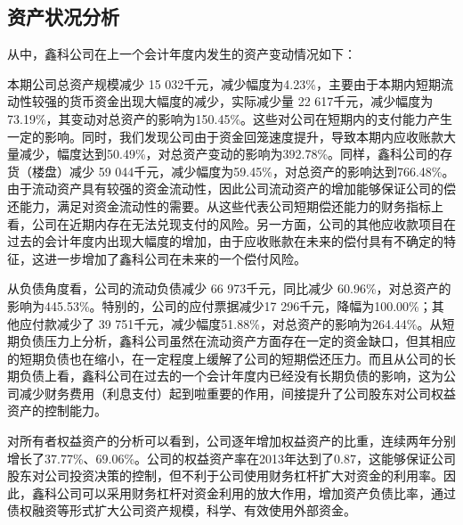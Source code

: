 \subsection{资产状况分析}
从中，鑫科公司在上一个会计年度内发生的资产变动情况如下：
\begin{compactenum}[(1) ]
 \item 本期公司总资产规模减少 15 032千元，减少幅度为4.23\%，主要由于本期内短期流动性较强的货币资金出现大幅度的减少，实际减少量 22 617千元，减少幅度为73.19\%，其变动对总资产的影响为150.45\%。这些对公司在短期内的支付能力产生一定的影响。同时，我们发现公司由于资金回笼速度提升，导致本期内应收账款大量减少，幅度达到50.49\%，对总资产变动的影响为392.78\%。同样，鑫科公司的存货（楼盘）减少 59 044千元，减少幅度为59.45\%，对总资产的影响达到766.48\%。由于流动资产具有较强的资金流动性，因此公司流动资产的增加能够保证公司的偿还能力，满足对资金流动性的需要。从这些代表公司短期偿还能力的财务指标上看，公司在近期内存在无法兑现支付的风险。另一方面，公司的其他应收款项目在过去的会计年度内出现大幅度的增加，由于应收账款在未来的偿付具有不确定的特征，这进一步增加了鑫科公司在未来的一个偿付风险。
 \item 从负债角度看，公司的流动负债减少 66 973千元，同比减少 60.96\%，对总资产的影响为445.53\%。特别的，公司的应付票据减少17 296千元，降幅为100.00\%；其他应付款减少了 39 751千元，减少幅度51.88\%，对总资产的影响为264.44\%。从短期负债压力上分析，鑫科公司虽然在流动资产方面存在一定的资金缺口，但其相应的短期负债也在缩小，在一定程度上缓解了公司的短期偿还压力。而且从公司的长期负债上看，鑫科公司在过去的一个会计年度内已经没有长期负债的影响，这为公司减少财务费用（利息支付）起到啦重要的作用，间接提升了公司股东对公司权益资产的控制能力。
 \item 对所有者权益资产的分析可以看到，公司逐年增加权益资产的比重，连续两年分别增长了37.77\%、69.06\%。公司的权益资产率在2013年达到了0.87，这能够保证公司股东对公司投资决策的控制，但不利于公司使用财务杠杆扩大对资金的利用率。因此，鑫科公司可以采用财务杠杆对资金利用的放大作用，增加资产负债比率，通过债权融资等形式扩大公司资产规模，科学、有效使用外部资金。
\end{compactenum}
